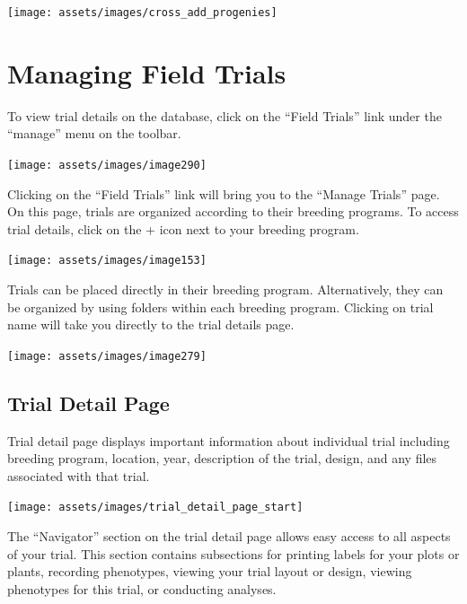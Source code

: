 \documentclass[
  12pt,
]{book}
\begin{document}
\begin{center}\texttt{[image: assets/images/cross\_add\_progenies]} \end{center}

\hypertarget{managing-field-trials}{%
\chapter{Managing Field Trials}\label{managing-field-trials}}

To view trial details on the database, click on the ``Field Trials'' link under the ``manage'' menu on the toolbar.

\begin{center}\texttt{[image: assets/images/image290]} \end{center}

Clicking on the ``Field Trials'' link will bring you to the ``Manage Trials'' page. On this page, trials are organized according to their breeding programs. To access trial details, click on the + icon next to your breeding program.

\begin{center}\texttt{[image: assets/images/image153]} \end{center}

Trials can be placed directly in their breeding program. Alternatively, they can be organized by using folders within each breeding program. Clicking on trial name will take you directly to the trial details page.

\begin{center}\texttt{[image: assets/images/image279]} \end{center}

\hypertarget{trial-detail-page}{%
\section{Trial Detail Page}\label{trial-detail-page}}

Trial detail page displays important information about individual trial including breeding program, location, year, description of the trial, design, and any files associated with that trial.

\begin{center}\texttt{[image: assets/images/trial\_detail\_page\_start]} \end{center}

The ``Navigator'' section on the trial detail page allows easy access to all aspects of your trial. This section contains subsections for printing labels for your plots or plants, recording phenotypes, viewing your trial layout or design, viewing phenotypes for this trial, or conducting analyses.
\end{document}

